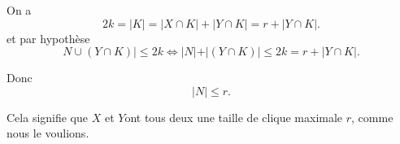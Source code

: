 \begin{sol}
On a $$ 2k = |K| = |X\cap K| + |Y\cap K| = r + |Y\cap K|. $$ 
et par hypothèse
$$N \cup (Y \cap K) | \leq 2k \Leftrightarrow |N | + |(Y \cap K) | \leq 2k = r + |Y\cap K|.$$

Donc $$| N | \leq r. $$

Cela signifie que $X $ et $Y $ont tous deux une taille de clique maximale $r$, comme nous le voulions.

\end{sol}
